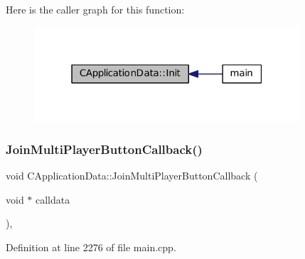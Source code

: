 Here is the caller graph for this function\+:
\nopagebreak
\begin{figure}[H]
\begin{center}
\leavevmode
\includegraphics[width=280pt]{classCApplicationData_ab757e7ad037decb18cefa3f4ad2e1298_icgraph}
\end{center}
\end{figure}
\hypertarget{classCApplicationData_a4fa8cf7a67c0ae980d38e1fe7b967f41}{}\label{classCApplicationData_a4fa8cf7a67c0ae980d38e1fe7b967f41} 
\subsubsection{\texorpdfstring{Join\+Multi\+Player\+Button\+Callback()}{JoinMultiPlayerButtonCallback()}}
{\footnotesize\ttfamily void C\+Application\+Data\+::\+Join\+Multi\+Player\+Button\+Callback (\begin{DoxyParamCaption}\item[{void $\ast$}]{calldata }\end{DoxyParamCaption})\hspace{0.3cm}{\ttfamily [static]}, {\ttfamily [protected]}}



Definition at line 2276 of file main.\+cpp.


